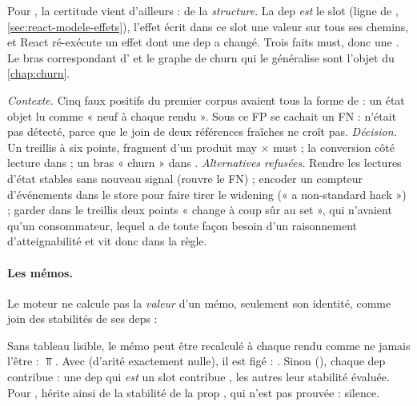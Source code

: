 Pour , la certitude vient d'ailleurs : de la \emph{structure}.
La dep  \emph{est} le slot (ligne  de
, \cref{sec:react-modele-effets}), l'effet écrit dans
ce slot une valeur  sur tous ses chemins, et React ré-exécute
un effet dont une dep a changé. Trois faits must, donc une \Error. Le bras
correspondant d' et le graphe de churn qui le généralise
sont l'objet du \cref{chap:churn}.

\begin{decision}
\emph{Contexte.} Cinq faux positifs  du premier
corpus avaient tous la forme de  : un état objet lu comme
« neuf à chaque rendu ». Sous ce FP se cachait un FN :  n'était
pas détecté, parce que le join de deux références fraîches ne croît pas.
\emph{Décision.} Un treillis à six points, fragment d'un produit may $\times$
must ; la conversion côté lecture dans  ; un bras « churn »
dans . \emph{Alternatives refusées.} Rendre les lectures
d'état stables sans nouveau signal (rouvre le FN) ; encoder un compteur
d'événements dans le store pour faire tirer le widening (« a non-standard
hack ») ; garder dans le treillis deux points « change à coup sûr au set »,
qui n'avaient qu'un consommateur, lequel a de toute façon besoin d'un
raisonnement d'atteignabilité et vit donc dans la règle.
\end{decision}

\paragraph{Les mémos.} Le moteur ne calcule pas la \emph{valeur} d'un mémo,
seulement son identité, comme join des stabilités de ses deps :


Sans tableau lisible, le mémo peut être recalculé à chaque rendu comme ne
jamais l'être : $\Top$. Avec \code{[]} (d'arité exactement nulle), il est
figé : . Sinon (),
chaque dep contribue : une dep qui \emph{est} un slot contribue
, les autres leur stabilité évaluée. Pour
,  hérite ainsi de la stabilité de la prop
, qui n'est pas prouvée  : silence.

